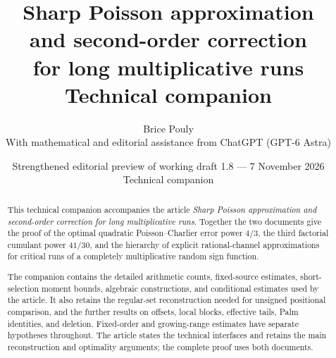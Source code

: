 \documentclass[11pt,a4paper]{article}
\title{\bfseries Sharp Poisson approximation\\and second-order correction\\for long multiplicative runs\\[9pt]\large Technical companion}
\author{Brice Pouly\\[5pt]
 \small With mathematical and editorial assistance from ChatGPT (GPT-6 Astra)}
\date{\small Strengthened editorial preview of working draft 1.8 --- 7 November 2026\\[3pt]Technical companion}
\begin{document}
\maketitle
\thispagestyle{plain}
\begin{abstract}
This technical companion accompanies the article \emph{Sharp Poisson
approximation and second-order correction for long multiplicative runs}.
Together the two documents give the proof of the optimal quadratic
Poisson--Charlier error power \(4/3\), the third factorial cumulant
power \(41/30\), and the hierarchy of explicit rational-channel
approximations for critical runs of a completely multiplicative
random sign function.

The companion contains the detailed arithmetic counts, fixed-source
estimates, short-selection moment bounds, algebraic constructions,
and conditional estimates used by the article. It also retains the
regular-set reconstruction needed for unsigned positional comparison,
and the further results on offsets, local blocks, effective tails,
Palm identities, and deletion. Fixed-order and growing-range
estimates have separate hypotheses throughout. The article states
the technical interfaces and retains the main reconstruction and
optimality arguments; the complete proof uses both documents.
\end{abstract}
\clearpage
\begingroup
\small
\setlength{\parskip}{0pt}
\tableofcontents
\endgroup
\clearpage























\clearpage

\end{document}
